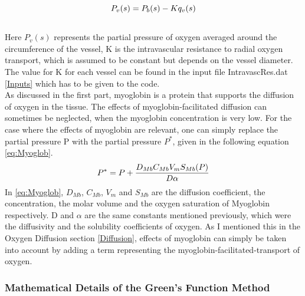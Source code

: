 \begin{equation}
\\P_v(s) = P_b(s) - Kq_v(s)
\label{eq:Hellums}
\end{equation}
\\Here $P_v(s)$ represents the partial pressure of oxygen averaged around the circumference of the vessel, K is the intravascular resistance to radial oxygen transport, which is assumed to be constant but depends on the vessel diameter. The value for K for each vessel can be found in the input file IntravascRes.dat \ref{Inputs} which has to be given to the code.
%
\\As discussed in the first part, myoglobin is a protein that supports the diffusion of oxygen in the tissue. The effects of myoglobin-facilitated diffusion can sometimes be neglected, when the myoglobin concentration is very low. For the case where the effects of myoglobin are relevant, one can simply replace the partial pressure P with the partial pressure $P^*$, given in the following equation \ref{eq:Myoglob}.
\begin{equation}
\\P^* = P + \frac{D_{Mb}C_{Mb}V_mS_{Mb}(P)}{D \alpha}
\label{eq:Myoglob}
\end{equation}
In \ref{eq:Myoglob}, $D_{Mb}$, $C_{Mb}$, $V_m$ and $S_{Mb}$ are the diffusion coefficient, the concentration, the molar volume and the oxygen saturation of Myoglobin respectively. D and $\alpha$ are the same constants mentioned previously, which were the diffusivity and the solubility coefficients of oxygen. As I mentioned this in the Oxygen Diffusion section \ref{Diffusion}, effects of myoglobin can simply be taken into account by adding a term representing the myoglobin-facilitated-transport of oxygen.

\newpage
\subsubsection{Mathematical Details of the Green's Function Method}

